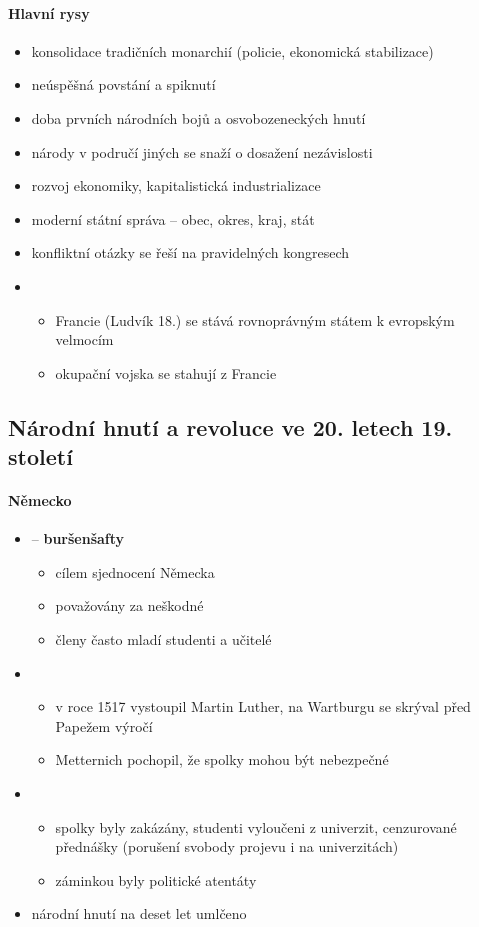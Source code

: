 \paragraph{Hlavní rysy}
\begin{itemize}
\item konsolidace tradičních monarchií (policie, ekonomická stabilizace)
\item neúspěšná povstání a spiknutí
\item doba prvních národních bojů a osvobozeneckých hnutí
\item národy v područí jiných se snaží o dosažení nezávislosti
\item rozvoj ekonomiky, kapitalistická industrializace
\item moderní státní správa -- obec, okres, kraj, stát
\item konfliktní otázky se řeší na pravidelných kongresech
\item {}
	\begin{itemize}
	\item Francie (Ludvík 18.) se stává rovnoprávným státem k evropským velmocím
	\item okupační vojska se stahují z Francie
	\end{itemize}
\end{itemize}

\subsection{Národní hnutí a revoluce ve 20. letech 19. století}
\paragraph{Německo}
\begin{itemize}
\item {} -- \textbf{buršenšafty}
	\begin{itemize}
	\item cílem sjednocení Německa
	\item považovány za neškodné
	\item členy často mladí studenti a učitelé
	\end{itemize}
\item {}
	\begin{itemize}
	\item v roce 1517 vystoupil Martin Luther, na Wartburgu se skrýval před Papežem \ra výročí
	\item[\ra] Metternich pochopil, že spolky mohou být nebezpečné
	\end{itemize}
\item {}
	\begin{itemize}
	\item spolky byly zakázány, studenti vyloučeni z univerzit, cenzurované přednášky (porušení svobody projevu i na univerzitách)
	\item záminkou byly politické atentáty
	\end{itemize}
\item[\ra] národní hnutí na deset let umlčeno
\end{itemize}

